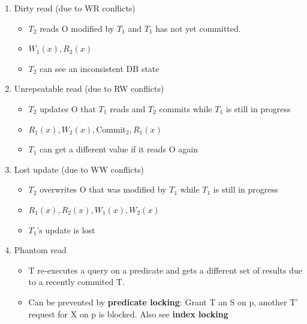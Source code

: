 \documentclass[9pt, landscape]{extarticle}
\begin{document}
\begin{multicols*}{4}
  \begin{enumerate}
    \item Dirty read (due to WR conflicts)
    \begin{itemize}
      \item $T_2$ reads O modified by $T_1$ and $T_1$ has not yet committed.
      \item $W_1(x), R_2(x)$
      \item $T_2$ can see an inconsistent DB state 
    \end{itemize}
    \item Unrepeatable read (due to RW conflicts)
    \begin{itemize}
      \item $T_2$ updates O that $T_1$ reads and $T_2$ commits while $T_1$ is still in progress
      \item $R_1(x), W_2(x), \text{Commit}_2, R_1(x)$
      \item $T_1$ can get a different value if it reads O again
    \end{itemize} 
    \item Lost update (due to WW conflicts)
    \begin{itemize}
      \item $T_2$ overwrites O that was modified by $T_1$ while $T_1$ is still in progress
      \item $R_1(x), R_2(x), W_1(x), W_2(x)$
      \item $T_1$'s update is lost
    \end{itemize}
    \item Phantom read
    \begin{itemize}
      \item T re-executes a query on a predicate and gets a different set of results due to a recently commited T.
      \item Can be prevented by \textbf{predicate locking}: Grant T an S on p, another T' request for X on p is blocked. Also see \textbf{index locking}
    \end{itemize}
  \end{enumerate}


\end{multicols*}
\end{document}
